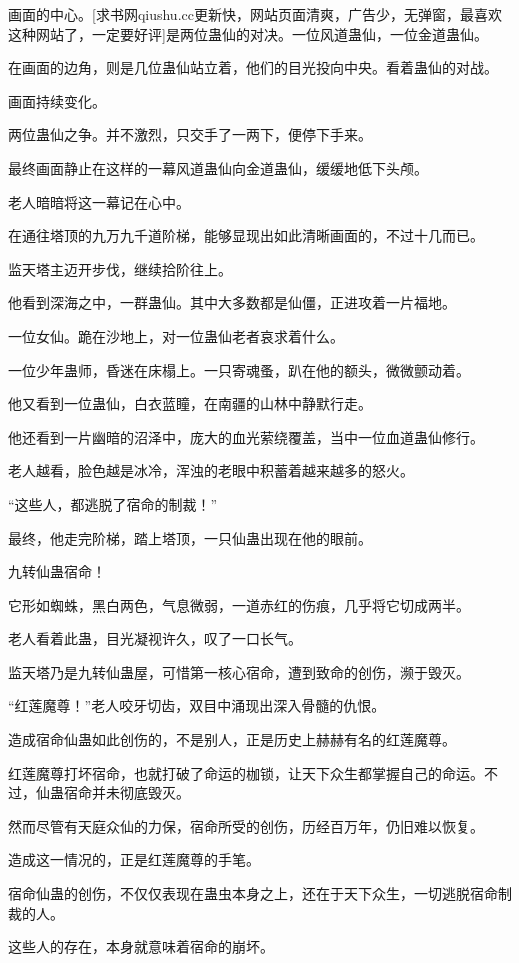 \begin{this_body}
画面的中心。[求书网qiushu.cc更新快，网站页面清爽，广告少，无弹窗，最喜欢这种网站了，一定要好评]是两位蛊仙的对决。一位风道蛊仙，一位金道蛊仙。

在画面的边角，则是几位蛊仙站立着，他们的目光投向中央。看着蛊仙的对战。

画面持续变化。

两位蛊仙之争。并不激烈，只交手了一两下，便停下手来。

最终画面静止在这样的一幕风道蛊仙向金道蛊仙，缓缓地低下头颅。

老人暗暗将这一幕记在心中。

在通往塔顶的九万九千道阶梯，能够显现出如此清晰画面的，不过十几而已。

监天塔主迈开步伐，继续拾阶往上。

他看到深海之中，一群蛊仙。其中大多数都是仙僵，正进攻着一片福地。

一位女仙。跪在沙地上，对一位蛊仙老者哀求着什么。

一位少年蛊师，昏迷在床榻上。一只寄魂蚤，趴在他的额头，微微颤动着。

他又看到一位蛊仙，白衣蓝瞳，在南疆的山林中静默行走。

他还看到一片幽暗的沼泽中，庞大的血光萦绕覆盖，当中一位血道蛊仙修行。

老人越看，脸色越是冰冷，浑浊的老眼中积蓄着越来越多的怒火。

“这些人，都逃脱了宿命的制裁！”

最终，他走完阶梯，踏上塔顶，一只仙蛊出现在他的眼前。

九转仙蛊宿命！

它形如蜘蛛，黑白两色，气息微弱，一道赤红的伤痕，几乎将它切成两半。

老人看着此蛊，目光凝视许久，叹了一口长气。

监天塔乃是九转仙蛊屋，可惜第一核心宿命，遭到致命的创伤，濒于毁灭。

“红莲魔尊！”老人咬牙切齿，双目中涌现出深入骨髓的仇恨。

造成宿命仙蛊如此创伤的，不是别人，正是历史上赫赫有名的红莲魔尊。

红莲魔尊打坏宿命，也就打破了命运的枷锁，让天下众生都掌握自己的命运。不过，仙蛊宿命并未彻底毁灭。

然而尽管有天庭众仙的力保，宿命所受的创伤，历经百万年，仍旧难以恢复。

造成这一情况的，正是红莲魔尊的手笔。

宿命仙蛊的创伤，不仅仅表现在蛊虫本身之上，还在于天下众生，一切逃脱宿命制裁的人。

这些人的存在，本身就意味着宿命的崩坏。


\end{this_body}
